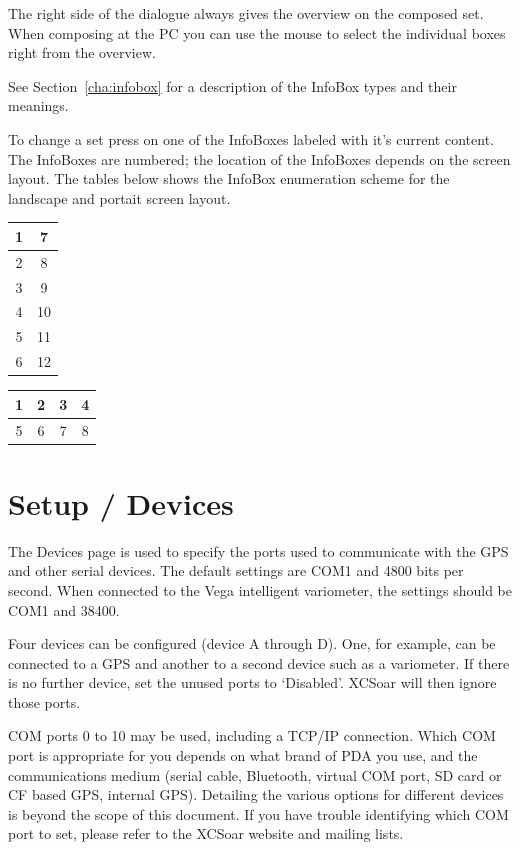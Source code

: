The right side of the dialogue always gives the overview on the composed set. 
When composing at the PC you can use the mouse to select the individual boxes 
right from the overview.

See Section~\ref{cha:infobox} for a description of the InfoBox types and their meanings.

To change a set press on one of the InfoBoxes labeled with it's current content.
The InfoBoxes are numbered; the location of the InfoBoxes depends on the screen layout.  
The tables below shows the InfoBox enumeration scheme for the 
landscape and portait screen layout.

\begin{multicols}{2}
\begin{tabular}{|c|c|}
\hline
1 & 7 \\
\hline
2 & 8 \\
\hline
3 & 9 \\
\hline
4 & 10 \\
\hline
5 & 11 \\
\hline
6 & 12 \\
\hline
\end{tabular}

\begin{tabular}{|c|c|c|c|}
\hline
1 & 2 & 3 & 4 \\
\hline
\hline
5 & 6 & 7 & 8 \\
\hline
\end{tabular}
\end{multicols}

\section{Setup / Devices} \label{conf:comdevices}

The Devices page is used to specify the ports used to communicate with
the GPS and other serial devices. The default settings are COM1 and
4800 bits per second.  When connected to the Vega intelligent
variometer, the settings should be COM1 and 38400.

Four devices can be configured (device A through D). One, for
example, can be connected to a GPS and another to a
second device such as a variometer.  If there is no further device, 
set the unused ports to `Disabled'.  XCSoar will then ignore those ports.

COM ports 0 to 10 may be used, including a TCP/IP connection.  
Which COM port is appropriate for you
depends on what brand of PDA you use, and the communications medium
(serial cable, Bluetooth, virtual COM port, SD card or CF based GPS,
internal GPS).  Detailing the various options for different devices is
beyond the scope of this document.  If you have trouble identifying
which COM port to set, please refer to the XCSoar website and mailing
lists.

